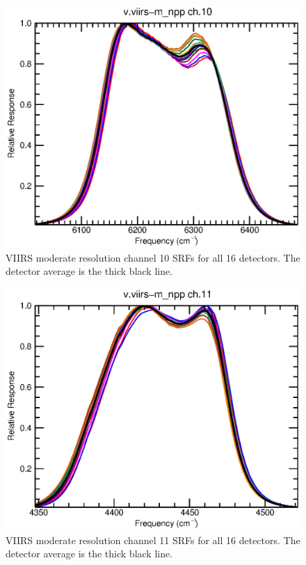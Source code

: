 \begin{figure}[H]
  \centering
  \includegraphics[bb= 0 15 400 330,clip,scale=0.8]{graphics/srfs/v.viirs-m_npp-10.eps}
  \caption{VIIRS moderate resolution channel 10 SRFs for all 16 detectors. The detector average is the thick black line.}
  \label{fig:v.viirs-m_npp-10}
\end{figure}
\begin{figure}[H]
  \centering
  \includegraphics[bb= 0 15 400 330,clip,scale=0.8]{graphics/srfs/v.viirs-m_npp-11.eps}
  \caption{VIIRS moderate resolution channel 11 SRFs for all 16 detectors. The detector average is the thick black line.}
  \label{fig:v.viirs-m_npp-11}
\end{figure}
